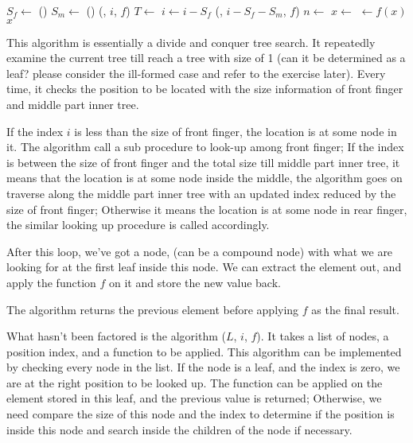 \documentclass[UTF8]{article}
\begin{document}
\begin{algorithmic}
    \State $S_f \gets $ ()
    \State $S_m \gets $ ()
      \State \Return {}(, $i$, $f$)
      \State $T \gets$ 
      \State $i \gets i - S_f$
    \Else
      \State \Return {}(, $i - S_f - S_m$, $f$)
    \EndIf
  \EndWhile
  \State $n \gets$ 
  \State $x \gets$ 
  \State {} $\gets f(x)$
  \State \Return $x$
\EndFunction
\end{algorithmic}

This algorithm is essentially a divide and conquer tree search. It repeatedly
examine the current tree till reach a tree with size of 1 (can it be determined
as a leaf? please consider the ill-formed case and refer to the exercise later).
Every time, it checks the position to be located with the size information of
front finger and middle part inner tree.

If the index $i$ is less than the size of front finger, the location is at some
node in it. The algorithm call a sub procedure to look-up among front finger;
If the index is between the size of front finger and the total size till middle
part inner tree, it means that the location is at some node inside the middle,
the algorithm goes on traverse along the middle part inner tree with an updated
index reduced by the size of front finger; Otherwise
it means the location is at some node in rear finger, the similar looking up
procedure is called accordingly.

After this loop, we've got a node, (can be a compound node)
with what we are looking for at the first leaf inside this node. We can extract
the element out, and apply the function $f$ on it and store the new value back.

The algorithm returns the previous element before applying $f$ as the final result.

What hasn't been factored is the algorithm ($L$, $i$, $f$).
It takes a list of nodes, a position index, and a function to be applied. This
algorithm can be implemented by checking every node in the list. If the node
is a leaf, and the index is zero, we are at the right position to be looked up.
The function can be applied on the element stored in this leaf, and the previous
value is returned; Otherwise, we need compare the size of this node and
the index to determine if the position is inside this node and search inside the
children of the node if necessary.
\end{document}
